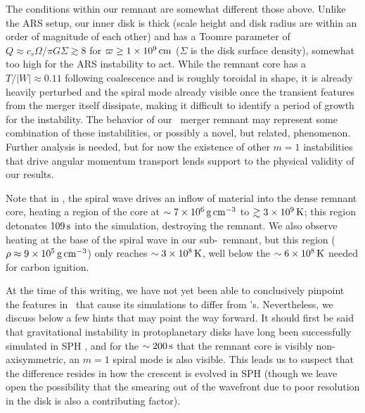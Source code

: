 
The conditions within our remnant are somewhat different those above.  Unlike the ARS setup, our inner disk is thick (scale height and disk radius are within an order of magnitude of each other) and has a Toomre parameter of $Q \approx c_s\Omega/\pi G \Sigma \gtrsim 8$ for $\varpi \geq 1\times10^9\,\mathrm{cm}$ ($\Sigma$ is the disk surface density), somewhat too high for the ARS instability to act.  While the remnant core has a $T/|W| \approx 0.11$ following coalescence and is roughly toroidal in shape, it is already heavily perturbed and the spiral mode already visible once the transient features from the merger itself dissipate, making it difficult to identify a period of growth for the instability.  The behavior of our \arepo\ merger remnant may represent some combination of these instabilities, or possibly a novel, but related, phenomenon.  Further analysis is needed, but for now the existence of other $m = 1$ instabilities that drive angular momentum transport lends support to the physical validity of our results.



Note that in \cite{kash+15}, the spiral wave drives an inflow of material into the dense remnant core, heating a region of the core at $\sim7\times10^6\,\gcc$ to $\gtrsim3\times10^9\,\mathrm{K}$; this region detonates $109\,\mathrm{s}$ into the simulation, destroying the remnant.  We also observe heating at the base of the spiral wave in our sub-\Mch\ remnant, but this region ($\rho \approx 9\times10^5\,\gcc$) only reaches $\sim3\times10^8\,\mathrm{K}$, well below the $\sim6\times10^8\,\mathrm{K}$ needed for carbon ignition.

At the time of this writing, we have not yet been able to conclusively pinpoint the features in \gasoline\ that cause its simulations to differ from \arepo's.  Nevertheless, we discuss below a few hints that may point the way forward.  It should first be said that gravitational instability in protoplanetary disks have long been successfully simulated in SPH \citep{ricela05, merub10, rogew12}, and for the $\sim200\,\mathrm{s}$ that the remnant core is visibly non-axisymmetric, an $m = 1$ spiral mode is also visible.  This leads us to suspect that the difference resides in how the crescent is evolved in SPH (though we leave open the possibility that the smearing out of the wavefront due to poor resolution in the disk is also a contributing factor).  

